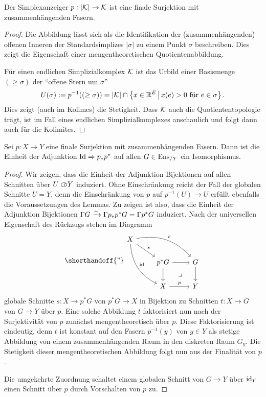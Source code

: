 \begin{lemma}
  Der Simplexanzeiger $p: |\mathcal{K}| \to \mathcal{K}$ ist eine finale Surjektion mit
  zu\-sam\-men\-hän\-gen\-den Fasern.
\end{lemma}
\begin{proof}
  Die Abbildung lässt sich als die Identifikation der
  (zusammenhängenden) offenen Inneren der Standardsimplizes $|\sigma|$
  zu einem Punkt $\sigma$ beschreiben. Dies zeigt die Eigenschaft
  einer mengentheoretischen Quotientenabbildung.

  Für einen endlichen Simplizialkomplex $\mathcal{K}$ ist das Urbild einer
  Basismenge $(\geq \sigma)$ der ``offene Stern um $\sigma$''
  \[ U(\sigma) := p^{-1}((\geq \sigma))
  = |\mathcal{K}| \cap \left\{ x \in \mathbb{R}^E \,\middle|\, x(e) > 0 \text{ für } e \in \sigma  \right\}.
  \]
  Dies zeigt (auch im Kolimes) die Stetigkeit. Dass $\mathcal{K}$ auch die
  Quotiententopologie trägt, ist im Fall eines endlichen
  Simplizialkomplexes anschaulich und folgt dann auch für die
  Kolimites.
\end{proof}
\begin{lemma}[\cite{TG}, 4.3.22] \label{final-pullback}
  Sei $p: X \to Y$ eine finale Surjektion mit zusammenhängenden
  Fasern. Dann ist die Einheit der Adjunktion $\operatorname{Id} \Rightarrow p_* p^*$ auf
  allen $G \in \operatorname{Ens}_{/Y}$ ein Isomorphismus.
\end{lemma}
\begin{proof}
  Wir zeigen, dass die Einheit der Adjunktion Bijektionen auf allen
  Schnitten über $U \subset\kern-0.58em\circ Y$ induziert. Ohne Einschränkung reicht der
  Fall der globalen Schnitte $U = Y$, denn die Einschränkung von $p$
  auf $p^{-1}(U) \to U$ erfüllt ebenfalls die Voraussetzungen des
  Lemmas. Zu zeigen ist also, dass die Einheit der Adjunktion
  Bijektionen $\Gamma G \xrightarrow[]{\sim} \Gamma p_* p^* G = \Gamma p^* G$
  induziert. Nach der universellen Eigenschaft des Rückzugs stehen im
  Diagramm
  \[
  \shorthandoff{"}
  \begin{tikzcd}
    X \arrow[ddr, bend right, "\id"]
    \arrow[drr, bend left,"t"] \arrow[dr, "s"] & & \\
    & p^* G \rar \dar \arrow[dr, phantom, "\lrcorner"]
    & G \dar \\
    & X \rar{p}
    & Y
  \end{tikzcd}
  \]
  globale Schnitte $s: X \to p^* G$ von $p^* G \to X$ in Bijektion zu
  Schnitten $t: X \to G$ von $G \to Y$ über $p$. Eine solche Abbildung
  $t$ faktorisiert nun nach der Surjektivität von $p$ zunächst
  mengentheoretisch über $p$. Diese Faktorisierung ist eindeutig, denn
  $t$ ist konstant auf den Fasern $p^{-1}(y)$ von $y \in Y$ als
  stetige Abbildung von einem zusammenhängenden Raum in den diskreten
  Raum $G_y$. Die Stetigkeit dieser mengentheoretischen Abbildung
  folgt nun aus der Finalität von $p$.

  Die umgekehrte Zuordnung schaltet einem globalen Schnitt von $G \to
  Y$ über $\operatorname{id}_Y$ einen Schnitt über $p$ durch Vorschalten von $p$ zu.
\end{proof}
